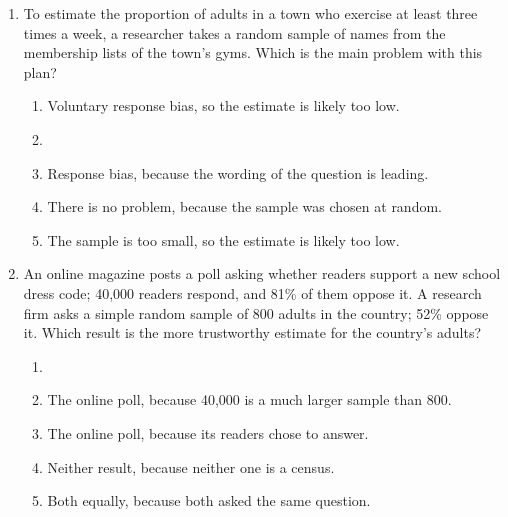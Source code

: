 \documentclass[12pt]{article}
\begin{document}
\begin{enumerate}[leftmargin=1.9em, itemsep=0.13in]
  \boxguard[13]
  \item To estimate the proportion of adults in a town who exercise at least three times a
        week, a researcher takes a random sample of names from the membership lists of the
        town's gyms. Which is the main problem with this plan?
        \begin{enumerate}[label=\textbf{(\Alph*)}, leftmargin=2.2em, itemsep=2pt]
          \item Voluntary response bias, so the estimate is likely too low.
          \item {}\\
          \item Response bias, because the wording of the question is leading.
          \item There is no problem, because the sample was chosen at random.
          \item The sample is too small, so the estimate is likely too low.\hfill{}\rule[-0.2in]{0pt}{0.48in}
        \end{enumerate}

  \boxguard[14]
  \item An online magazine posts a poll asking whether readers support a new school dress
        code; 40{,}000 readers respond, and 81\% of them oppose it. A research firm asks a
        simple random sample of 800 adults in the country; 52\% oppose it. Which result is the
        more trustworthy estimate for the country's adults?
        \begin{enumerate}[label=\textbf{(\Alph*)}, leftmargin=2.2em, itemsep=2pt]
          \item {}\\
          \item The online poll, because 40{,}000 is a much larger sample than 800.
          \item The online poll, because its readers chose to answer.
          \item Neither result, because neither one is a census.
          \item Both equally, because both asked the same question.\hfill{}\rule[-0.2in]{0pt}{0.48in}
        \end{enumerate}


\end{enumerate}
\end{document}
